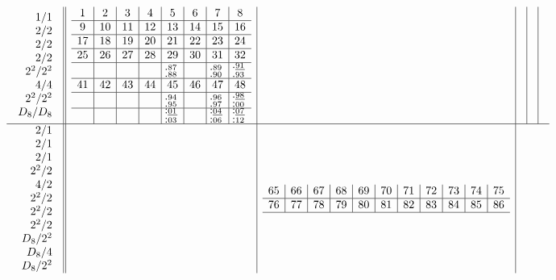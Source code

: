 \documentclass[11pt,a4paper]{amsart}
\begin{document}
\newpage

\footnotesize{}

\begin{align*}
  \begin{array}{r||c|c|c|c|c}
    \begin{array}{r}
      1/1 \\ 2/2 \\ 2/2 \\ 2/2 \\ 2^2/2^2 \\ 4/4 \\ 2^2/2^2 \\ D_8/D_8 \\
    \end{array}
&
  \begin{array}{c|c|c|c|c|c|c|c}
    1&2&3&4&5&6&7&8\\\hline
9&10&11&12&13&14&15&16\\\hline
17&18&19&20&21&22&23&24\\\hline
25&26&27&28&29&30&31&32\\\hline
&&&&^{\llap.87}_{\llap.88}&&^{\llap.89}_{\llap.90}&^{\underline{\llap.91}}_{\llap.93}\\\hline
41&42&43&44&45&46&47&48\\\hline
&&&&^{\llap.94}_{\llap.95}&&^{\llap.96}_{\llap.97}&^{\underline{\llap.98}}_{\llap:00}\\\hline
&&&&^{\underline{\llap:01}}_{\llap:03}&&^{\underline{\llap:04}}_{\llap:06}&^{\underline{\llap:07}}_{\llap:12}\\
  \end{array}
&&&&\\ \hline
    \begin{array}{r}
      2/1 \\ 2/1 \\ 2/1 \\ 2^2/2 \\ 4/2 \\ 2^2/2 \\ 2^2/2 \\ 2^2/2 \\
      D_8/2^2 \\ D_8/4 \\ D_8/2^2 \\
    \end{array}
    &&
       \begin{array}{c|c|c|c|c|c|c|c|c|c|c}
65&66&67&68&69&70&71&72&73&74&75\\\hline
76&77&78&79&80&81&82&83&84&85&86\\\hline

\end{array}
\end{array}
\end{align*}
\end{document}

